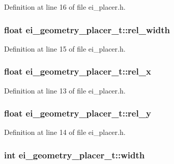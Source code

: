 Definition at line 16 of file ei\_\-placer.h.\hypertarget{structei__geometry__placer__t_a92077f3d2d7342777ec5233ee5d7057c}{
\subsubsection[{rel\_\-width}]{\setlength{\rightskip}{0pt plus 5cm}float {\bf ei\_\-geometry\_\-placer\_\-t::rel\_\-width}}}
\label{structei__geometry__placer__t_a92077f3d2d7342777ec5233ee5d7057c}


Definition at line 15 of file ei\_\-placer.h.\hypertarget{structei__geometry__placer__t_af290c8cbf1fe4235bb81d4997a53b4ec}{
\subsubsection[{rel\_\-x}]{\setlength{\rightskip}{0pt plus 5cm}float {\bf ei\_\-geometry\_\-placer\_\-t::rel\_\-x}}}
\label{structei__geometry__placer__t_af290c8cbf1fe4235bb81d4997a53b4ec}


Definition at line 13 of file ei\_\-placer.h.\hypertarget{structei__geometry__placer__t_ac6ca9e4bf2fb1a9d4494fc9a1abf412c}{
\subsubsection[{rel\_\-y}]{\setlength{\rightskip}{0pt plus 5cm}float {\bf ei\_\-geometry\_\-placer\_\-t::rel\_\-y}}}
\label{structei__geometry__placer__t_ac6ca9e4bf2fb1a9d4494fc9a1abf412c}


Definition at line 14 of file ei\_\-placer.h.\hypertarget{structei__geometry__placer__t_a768d062aa067ee8fe05863cd5b30e350}{
\subsubsection[{width}]{\setlength{\rightskip}{0pt plus 5cm}int {\bf ei\_\-geometry\_\-placer\_\-t::width}}}
\label{structei__geometry__placer__t_a768d062aa067ee8fe05863cd5b30e350}


